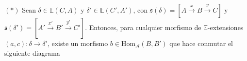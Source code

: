 \documentclass[preview]{standalone}
\begin{document}
\begin{center}
\justifying $(\ast)$ Sean $\delta\in\mathbb{E}(C,A)$ y $\delta'\in\mathbb{E}(C',A')$, con $\mathfrak{s}(\delta) = [A\xrightarrow{x} B\xrightarrow{y} C]$ y $\mathfrak{s}(\delta') = [A'\xrightarrow{x'} B'\xrightarrow{y'} C']$. Entonces, para cualquier morfismo de $\mathbb{E}$-extensiones $(a,c):\delta\to\delta'$, existe un morfismo $b\in\text{Hom}_\mathscr{A}(B,B')$ que hace conmutar el siguiente diagrama
\end{center}
\end{document}
